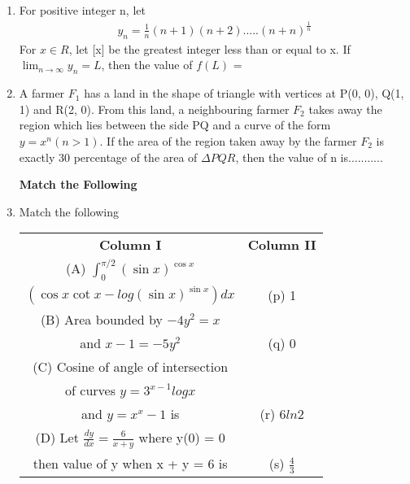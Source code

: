 \begin{enumerate}[label=\arabic*.,ref=\thesubsection.\theenumi]
\item For positive integer n, let
\begin{align*}
y_n = \frac{1}{n}(n + 1)(n + 2).....(n + n)^{\frac{1}{n}}
\end{align*} 
For $x \in R$, let [x] be the greatest integer less than or equal to x. If $\lim_{n \to \infty}y_n = L$, then the value of $f(L)$ =

\item A farmer $F_1$ has a land in the shape of triangle with vertices at P(0, 0), Q(1, 1) and R(2, 0). From this land, a neighbouring farmer $F_2$ takes away the region which lies between the side PQ and a curve of the form $y = x^n(n > 1)$. If the area of the region taken away by the farmer $F_2$ is exactly 30 percentage of the area of $\Delta PQR$, then the value of n is...........

\clearpage

\textbf{Match the Following}

\item Match the following
\begin{table}[ht!]
\centering
\begin{tabular}{c c} 
 \textbf{Column I} & \textbf{Column II}\\ [0.5ex] 
 (A) $\int_{0}^{\pi/2}(\sin x)^{\cos x}$\\ $\left(\cos x\cot x
     - log(\sin x)^{\sin x} \right)dx$                                          &(p) 1\\ 
 (B) Area bounded by $-4y^2 = x$\\ and $x - 1 = -5y^2$                            &(q) 0\\
 (C) Cosine of angle of intersection\\ of curves
     $y = 3^{x-1}log x$\\ and $y = x^x - 1$ is                                      &(r) 6$ln2$\\                                                                     
 (D) Let $\frac{dy}{dx} = \frac{6}{x + y}$ where y(0) = 0\\
     then value of y when x + y = 6 is                                            &(s) $\frac{4}{3}$\\[1ex] 
\end{tabular}
\end{table}\\


\end{enumerate}
